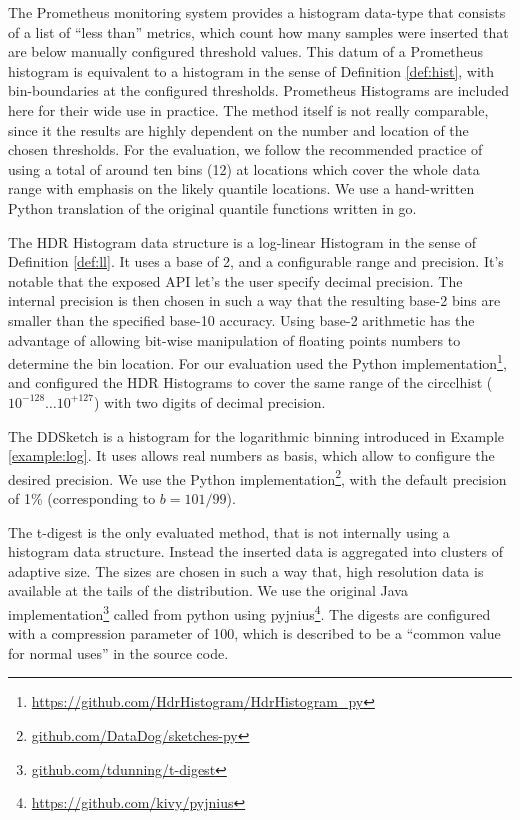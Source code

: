 \documentclass{article}
\theoremstyle{plain}
\theoremstyle{remark}
\begin{document}
The Prometheus monitoring system provides a histogram data-type that consists of a list of ``less
than'' metrics, which count how many samples were inserted that are below manually configured
threshold values. This datum of a Prometheus histogram is equivalent to a histogram in the sense of
Definition \ref{def:hist}, with bin-boundaries at the configured thresholds.  Prometheus Histograms
are included here for their wide use in practice.  The method itself is not really comparable, since
it the results are highly dependent on the number and location of the chosen thresholds. For the
evaluation, we follow the recommended practice of using a total of around ten bins (12) at locations
which cover the whole data range with emphasis on the likely quantile locations.  We use a
hand-written Python translation of the original quantile functions written in go.

The HDR Histogram data structure is a log-linear Histogram in the sense of Definition \ref{def:ll}.
It uses a base of 2, and a configurable range and precision.  It's notable that the exposed API
let's the user specify decimal precision.  The internal precision is then chosen in such a way that
the resulting base-2 bins are smaller than the specified base-10 accuracy.  Using base-2 arithmetic
has the advantage of allowing bit-wise manipulation of floating points numbers to determine the bin
location. For our evaluation used the Python
implementation\footnote{\url{https://github.com/HdrHistogram/HdrHistogram_py}}, and configured the
HDR Histograms to cover the same range of the circclhist ($10^{-128}\dots10^{+127}$) with two digits
of decimal precision.

The DDSketch is a histogram for the logarithmic binning introduced in Example \ref{example:log}.
It uses allows real numbers as basis, which allow to configure the desired precision.
We use the Python implementation\footnote{\url{github.com/DataDog/sketches-py}}, with the default
precision of 1\% (corresponding to $b=101/99$).

The t-digest is the only evaluated method, that is not internally using a histogram data structure.
Instead the inserted data is aggregated into clusters of adaptive size.  The sizes are chosen in
such a way that, high resolution data is available at the tails of the distribution.  We use the
original Java implementation\footnote{\url{github.com/tdunning/t-digest}} called from python
using pyjnius\footnote{\url{https://github.com/kivy/pyjnius}}. The digests are configured with a
compression parameter of 100, which is described to be a ``common value for normal uses'' in
the source code.
\end{document}
